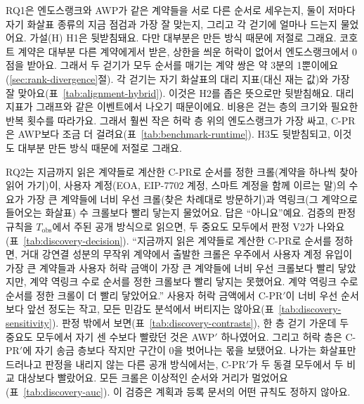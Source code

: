 RQ1은 엔도스랭크와 AWP가 같은 계약들을 서로 다른 순서로 세우는지, 둘이 저마다 자기 화살표 종류의 지금 점검과 가장 잘 맞는지, 그리고 각 걷기에 얼마나 드는지 물었어요. 가설(H) H1은 뒷받침돼요. 다만 대부분은 만든 방식 때문에 저절로 그래요. 코호트 계약은 대부분 다른 계약에게서 받은, 상한을 씌운 허락이 없어서 엔도스랭크에서 0점을 받아요. 그래서 두 걷기가 모두 순서를 매기는 계약 쌍은 약 3분의 1뿐이에요(\ref{sec:rank-divergence}절). 각 걷기는 자기 화살표의 대리 지표(대신 재는 값)와 가장 잘 맞아요(표~\ref{tab:alignment-hybrid}). 이것은 H2를 좁은 뜻으로만 뒷받침해요. 대리 지표가 그래프와 같은 이벤트에서 나오기 때문이에요. 비용은 걷는 층의 크기와 필요한 반복 횟수를 따라가요. 그래서 훨씬 작은 허락 층 위의 엔도스랭크가 가장 싸고, \mbox{C-PR}은 AWP보다 조금 더 걸려요(표~\ref{tab:benchmark-runtime}). H3도 뒷받침되고, 이것도 대부분 만든 방식 때문에 저절로 그래요.

RQ2는 지금까지 읽은 계약들로 계산한 \mbox{C-PR}로 순서를 정한 크롤(계약을 하나씩 찾아 읽어 가기)이, 사용자 계정(EOA, EIP-7702 계정, 스마트 계정을 함께 이르는 말)의 수요가 가장 큰 계약들에 너비 우선 크롤(찾은 차례대로 방문하기)과 역링크(그 계약으로 들어오는 화살표) 수 크롤보다 빨리 닿는지 물었어요. 답은 “아니요”예요. 검증의 판정 규칙을 $T_{\mathrm{obs}}$에서 주된 공개 방식으로 읽으면, 두 중요도 모두에서 판정 V2가 나와요(표~\ref{tab:discovery-decision}). “지금까지 읽은 계약들로 계산한 \mbox{C-PR}로 순서를 정하면, 거대 강연결 성분의 무작위 계약에서 출발한 크롤은 우주에서 사용자 계정 유입이 가장 큰 계약들과 사용자 허락 금액이 가장 큰 계약들에 너비 우선 크롤보다 빨리 닿았지만, 계약 역링크 수로 순서를 정한 크롤보다 빨리 닿지는 못했어요. 계약 역링크 수로 순서를 정한 크롤이 더 빨리 닿았어요.” 사용자 허락 금액에서 \mbox{C-PR}$'$이 너비 우선 순서보다 앞선 정도는 작고, 모든 민감도 분석에서 버티지는 않아요(표~\ref{tab:discovery-sensitivity}). 판정 밖에서 보면(표~\ref{tab:discovery-contrasts}), 한 층 걷기 가운데 두 중요도 모두에서 자기 센 수보다 빨랐던 것은 AWP$'$ 하나였어요. 그리고 허락 층은 \mbox{C-PR}$'$에 자기 송금 층보다 작지만 구간이 0을 벗어나는 몫을 보탰어요. 나가는 화살표만 드러나고 판정을 내리지 않는 다른 공개 방식에서는, \mbox{C-PR}$'$가 두 동결 모두에서 두 비교 대상보다 빨랐어요. 모든 크롤은 이상적인 순서와 거리가 멀었어요(표~\ref{tab:discovery-auc}). 이 검증은 계획과 등록 문서의 어떤 규칙도 정하지 않아요.

